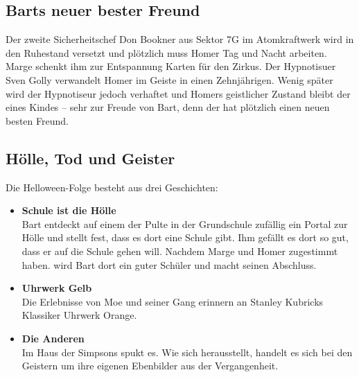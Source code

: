 
\subsection{Barts neuer bester Freund}\label{TABF05}
Der zweite Sicherheitschef Don Bookner aus Sektor 7G im Atomkraftwerk wird in den Ruhestand versetzt und plötzlich muss Homer Tag und Nacht arbeiten. Marge schenkt ihm zur Entspannung Karten für den Zirkus. Der Hypnotisuer Sven Golly verwandelt Homer im Geiste in einen Zehnjährigen. Wenig später wird der Hypnotiseur jedoch verhaftet und Homers geistlicher Zustand bleibt der eines Kindes -- sehr zur Freude von Bart, denn der hat plötzlich einen neuen besten Freund.


\subsection{Hölle, Tod und Geister}
Die Helloween-Folge besteht aus drei Geschichten:
\begin{itemize}
	\item \textbf{Schule ist die Hölle}\\ Bart entdeckt auf einem der Pulte in der Grundschule zufällig ein Portal zur Hölle und stellt fest, dass es dort eine Schule gibt. Ihm gefällt es dort so gut, dass er auf die Schule gehen will. Nachdem Marge und Homer zugestimmt haben. wird Bart dort ein guter Schüler und macht seinen Abschluss.
	\item \textbf{Uhrwerk Gelb}\\ Die Erlebnisse von Moe und seiner Gang erinnern an Stanley Kubricks Klassiker \glqq Uhrwerk Orange\grqq .
	\item \textbf{Die Anderen}\\ Im Haus der Simpsons spukt es. Wie sich herausstellt, handelt es sich bei den Geistern um ihre eigenen Ebenbilder aus der Vergangenheit.
\end{itemize}

